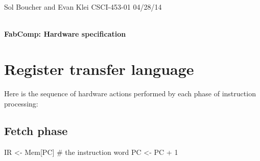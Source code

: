 \documentclass[12pt]{article}
\begin{document}
\setlength{\parindent}{0pt}

\begin{framed}
Sol Boucher and Evan Klei \hfill CSCI-453-01 \hfill 04/28/14 \\
\vspace{6pt} \\
\centerline{\textbf{\huge FabComp: Hardware specification}}
\end{framed}

\section{Register transfer language}
Here is the sequence of hardware actions performed by each phase of instruction processing:

\subsection{Fetch phase}
\begin{verbatimtab}
IR <- Mem[PC] # the instruction word
PC <- PC + 1
\end{verbatimtab}
\end{document}
